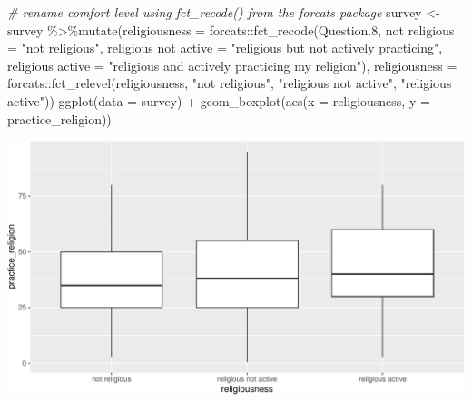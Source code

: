 \documentclass[
]{book}
\newenvironment{Shaded}{\begin{snugshade}}{\end{snugshade}}
\newcommand{\AttributeTok}[1]{\textcolor[rgb]{0.77,0.63,0.00}{#1}}
\newcommand{\CommentTok}[1]{\textcolor[rgb]{0.56,0.35,0.01}{\textit{#1}}}
\newcommand{\FloatTok}[1]{\textcolor[rgb]{0.00,0.00,0.81}{#1}}
\newcommand{\FunctionTok}[1]{\textcolor[rgb]{0.00,0.00,0.00}{#1}}
\newcommand{\NormalTok}[1]{#1}
\newcommand{\OtherTok}[1]{\textcolor[rgb]{0.56,0.35,0.01}{#1}}
\newcommand{\SpecialCharTok}[1]{\textcolor[rgb]{0.00,0.00,0.00}{#1}}
\newcommand{\StringTok}[1]{\textcolor[rgb]{0.31,0.60,0.02}{#1}}
\begin{document}
\begin{Shaded}
\begin{Highlighting}[]
\CommentTok{\# rename comfort level using fct\_recode() from the forcats package}
\NormalTok{survey }\OtherTok{\textless{}{-}}\NormalTok{ survey }\SpecialCharTok{\%\textgreater{}\%}\FunctionTok{mutate}\NormalTok{(}\AttributeTok{religiousness =}\NormalTok{ forcats}\SpecialCharTok{::}\FunctionTok{fct\_recode}\NormalTok{(Question}\FloatTok{.8}\NormalTok{, }
                          \StringTok{\textasciigrave{}}\AttributeTok{not religious}\StringTok{\textasciigrave{}} \OtherTok{=} \StringTok{"not religious"}\NormalTok{,}
                          \StringTok{\textasciigrave{}}\AttributeTok{religious not active}\StringTok{\textasciigrave{}} \OtherTok{=} \StringTok{"religious but not actively practicing"}\NormalTok{,}
                          \StringTok{\textasciigrave{}}\AttributeTok{religious active}\StringTok{\textasciigrave{}} \OtherTok{=} \StringTok{"religious and actively practicing my religion"}\NormalTok{),}
                          \AttributeTok{religiousness =}\NormalTok{ forcats}\SpecialCharTok{::}\FunctionTok{fct\_relevel}\NormalTok{(religiousness,}
                                                               \StringTok{"not religious"}\NormalTok{,}
                                                               \StringTok{"religious not active"}\NormalTok{,}
                                                               \StringTok{"religious active"}\NormalTok{))}
\FunctionTok{ggplot}\NormalTok{(}\AttributeTok{data =}\NormalTok{ survey) }\SpecialCharTok{+}
    \FunctionTok{geom\_boxplot}\NormalTok{(}\FunctionTok{aes}\NormalTok{(}\AttributeTok{x =}\NormalTok{ religiousness, }\AttributeTok{y =}\NormalTok{ practice\_religion))}
\end{Highlighting}
\end{Shaded}

\includegraphics[width=1\linewidth]{Class_Activity_23_files/figure-latex/unnamed-chunk-4-1}
\end{document}
